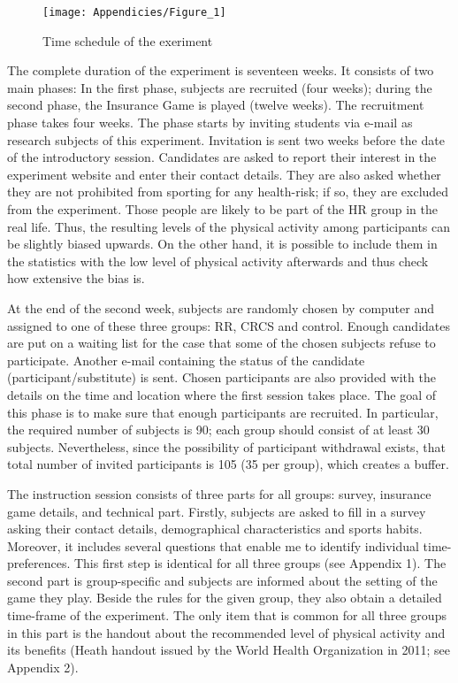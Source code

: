 \documentclass[12pt,english]{article}%
\begin{document}
\begin{figure}
\centering
\texttt{[image: Appendicies/Figure\_1]}
\caption{Time schedule of the exeriment}
\label{fig:Figure_1}
\end{figure}

The complete duration of the experiment is seventeen weeks. It consists of two main phases: In the first phase, subjects are recruited (four weeks); during the second phase, the Insurance Game is played (twelve weeks). The recruitment phase takes four weeks. The phase starts by inviting students via e-mail as research subjects of this experiment. Invitation is sent two weeks before the date of the introductory session. Candidates are asked to report their interest in the experiment website and enter their contact details. They are also asked whether they are not prohibited from sporting for any health-risk; if so, they are excluded from the experiment. Those people are likely to be part of the HR group in the real life. Thus, the resulting levels of the physical activity among participants can be slightly biased upwards. On the other hand, it is possible to include them in the statistics with the low level of physical activity afterwards and thus check how extensive the bias is. 

At the end of the second week, subjects are randomly chosen by computer and assigned to one of these three groups: RR, CRCS and control. Enough candidates are put on a waiting list for the case that some of the chosen subjects refuse to participate. Another e-mail containing the status of the candidate (participant/substitute) is sent. Chosen participants are also provided with the details on the time and location where the first session takes place. The goal of this phase is to make sure that enough participants are recruited. In particular, the required number of subjects is 90; each group should consist of at least 30 subjects. Nevertheless, since the possibility of participant withdrawal exists, that total number of invited participants is 105 (35 per group), which creates a buffer.    

The instruction session consists of three parts for all groups: survey, insurance game details, and technical part. Firstly, subjects are asked to fill in a survey asking their contact details, demographical characteristics and sports habits. Moreover, it includes several questions that enable me to identify individual time-preferences. This first step is identical for all three groups (see Appendix 1). The second part is group-specific and subjects are informed about the setting of the game they play. Beside the rules for the given group, they also obtain a detailed time-frame of the experiment. The only item that is common for all three groups in this part is the handout about the recommended level of physical activity and its benefits (Heath handout issued by the World Health Organization in 2011; see Appendix 2).
\end{document}
